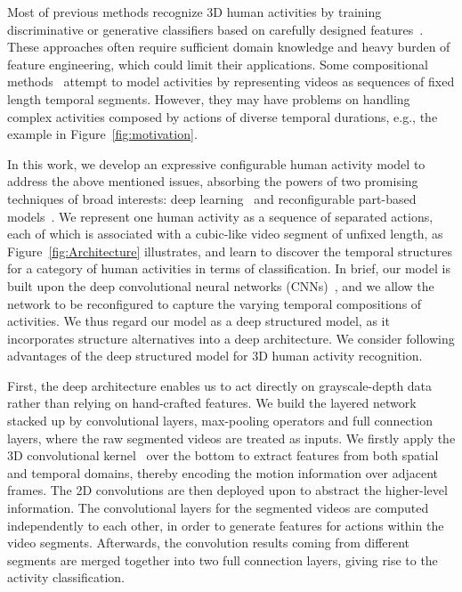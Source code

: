 \documentclass{sig-alternate}
\begin{document}
Most of previous methods recognize 3D human activities by training discriminative or generative classifiers based on carefully designed features~\cite{HOJ3D,HON4D,DSTIP,WuYingCVPR2012}. These approaches often require sufficient domain knowledge and heavy burden of feature engineering, which could limit their applications. Some compositional methods~\cite{WangPAMI2011,CIVU2013survey} attempt to model activities by representing videos as sequences of fixed length temporal segments. However, they may have problems on handling complex activities composed by actions of diverse temporal durations, e.g., the example in  Figure~\ref{fig:motivation}.


In this work, we develop an expressive configurable human activity model to address the above mentioned issues, absorbing the powers of two promising techniques of broad interests: deep learning~\cite{CNN1990,Hinton06,ImagenetNIPS2012,3DCNNPAMI, MDLACM13, PPDDNN13,AOGCVPR2013} and reconfigurable part-based models~\cite{AOGZhu2006, SinisaSPNCVPR2012, AOGICCV2011,LinGrammar}. We represent one human activity as a sequence of separated actions, each of which is associated with a cubic-like video segment of unfixed length, as Figure~\ref{fig:Architecture} illustrates, and learn to discover the temporal structures for a category of human activities in terms of classification. In brief, our model is built upon the deep convolutional neural networks (CNNs)~\cite{CNN1990,3DCNNPAMI}, and we allow the network to be reconfigured to capture the varying temporal compositions of activities.  We thus regard our model as a deep structured model, as it incorporates structure alternatives into a deep architecture. We consider following advantages of the deep structured model for 3D human activity recognition.

First, the deep architecture enables us to act directly on grayscale-depth data rather than relying on hand-crafted features. We build the layered network stacked up by convolutional layers, max-pooling operators and full connection layers, where the raw segmented videos are treated as inputs. We firstly apply the 3D convolutional kernel~\cite{3DCNNPAMI} over the bottom to extract features from both spatial and temporal domains, thereby encoding the motion information over adjacent frames. The 2D convolutions are then deployed upon to abstract the higher-level information. The convolutional layers for the segmented videos are computed independently to each other, in order to generate features for actions within the video segments. Afterwards, the convolution results coming from different segments are merged together into two full connection layers, giving rise to the activity classification.
\end{document}
